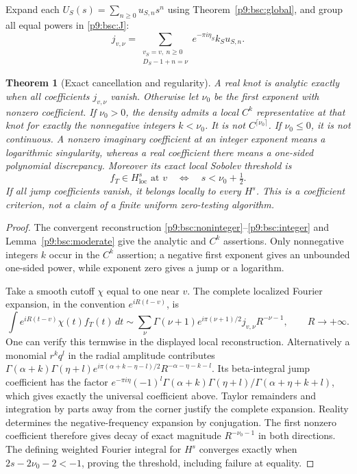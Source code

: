 \documentclass[11pt,a4paper]{article}
\newtheorem{theorem}{Theorem}[section]
\theoremstyle{definition}
\theoremstyle{remark}
\numberwithin{equation}{section}
\begin{document}
Expand each $U_S(s)=\sum_{n\ge0}u_{S,n}s^n$ using
Theorem~\ref{p9:bsc:global}, and group all equal powers in
\eqref{p9:bsc:J}:
\begin{equation}\label{p9:bsc:coeff}
 j_{v,\nu}=\sum_{\substack{v_S=v,\ n\ge0\\D_S-1+n=\nu}}
             e^{-\pi i\eta_S}k_Su_{S,n}.
\end{equation}
\begin{theorem}[Exact cancellation and regularity]\label{p9:bsc:regularity}
A real knot is analytic exactly when all coefficients
$j_{v,\nu}$ vanish. Otherwise let $\nu_0$ be the first exponent
with nonzero coefficient. If $\nu_0>0$, the density admits a local
$C^k$ representative at that knot for exactly the nonnegative integers $k<\nu_0$.
It is not $C^{\lceil\nu_0\rceil}$. If $\nu_0\le0$, it is not
continuous. A nonzero imaginary coefficient at an integer exponent
means a logarithmic singularity, whereas a real coefficient there
means a one-sided polynomial discrepancy. Moreover its exact local
Sobolev threshold is
\[
                 f_T\in H^s_{\mathrm{loc}}\text{ at }v
                 \quad\Longleftrightarrow\quad s<\nu_0+\tfrac12.
\]
If all jump coefficients vanish, it belongs locally to every $H^s$.
This is a coefficient criterion, not a claim of a finite uniform
zero-testing algorithm.
\end{theorem}
\begin{proof}
The convergent reconstruction \eqref{p9:bsc:noninteger}--\eqref{p9:bsc:integer}
and Lemma~\ref{p9:bsc:moderate} give the analytic and $C^k$ assertions.
Only nonnegative integers $k$ occur in the $C^k$ assertion; a negative
first exponent gives an unbounded one-sided power, while exponent
zero gives a jump or a logarithm.

Take a smooth cutoff $\chi$ equal to one near $v$. The complete
localized Fourier expansion, in the convention $e^{iR(t-v)}$, is
\[
 \int e^{iR(t-v)}\chi(t)f_T(t)\,dt
 \sim\sum_\nu \Gamma(\nu+1)e^{i\pi(\nu+1)/2}
                         j_{v,\nu}R^{-\nu-1},\qquad R\to+\infty.
\]
One can verify this termwise in the displayed local reconstruction.
Alternatively a monomial $r^kq^l$ in the radial amplitude contributes
$\Gamma(\alpha+k)\Gamma(\eta+l)
e^{i\pi(\alpha+k-\eta-l)/2}R^{-\alpha-\eta-k-l}$.
Its beta-integral jump coefficient has the factor
$e^{-\pi i\eta}(-1)^l
\Gamma(\alpha+k)\Gamma(\eta+l)/\Gamma(\alpha+\eta+k+l)$,
which gives exactly the universal coefficient above. Taylor
remainders and integration by parts away from the corner justify
the complete expansion. Reality determines the negative-frequency
expansion by conjugation. The first nonzero coefficient therefore
gives decay of exact magnitude $R^{-\nu_0-1}$ in both directions.
The defining weighted Fourier integral for $H^s$ converges exactly
when $2s-2\nu_0-2<-1$, proving the threshold, including failure
at equality.
\end{proof}
\end{document}
